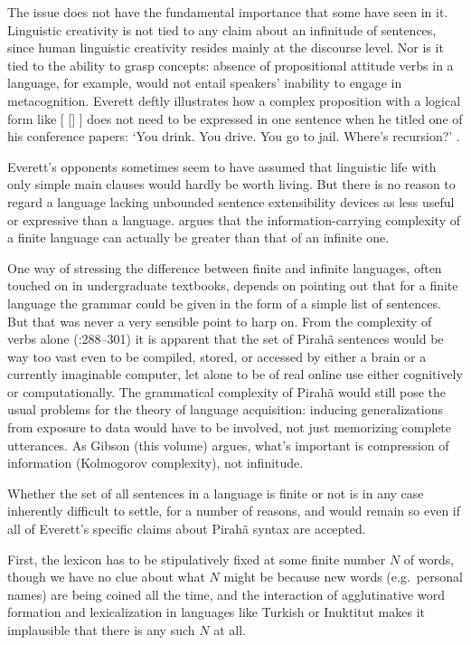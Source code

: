 \documentclass[output=paper,colorlinks,citecolor=brown
]{langscibook}
\begin{document}
The issue does not have the fundamental importance that some have seen
in it. Linguistic creativity is not tied to any claim about an infinitude
of sentences, since human linguistic creativity resides mainly at the
discourse level. Nor is it tied to the ability to grasp concepts:
absence of propositional attitude verbs in a language, for example,
would not entail speakers' inability to engage in metacognition.
Everett deftly illustrates how a complex proposition with a logical
form like [ [] ]  does not need
to be expressed in one sentence when he titled one of his conference
papers: `You drink. You drive. You go to jail. Where's recursion?'
\citep{Everett10}.

Everett's opponents sometimes seem to have assumed that linguistic
life with only simple main clauses would hardly be worth living.
But there is no reason to regard a language lacking unbounded sentence
extensibility devices as less useful or expressive than a language.
\citet{Kornai14} argues that the information-carrying complexity of
a finite language can actually be greater than that of an infinite one.

One way of stressing the difference between finite and infinite languages,
often touched on in undergraduate textbooks, depends on pointing out that
for a finite language the grammar could be given in the form of a simple
list of sentences. But that was never a very sensible point to harp on.
From the complexity of verbs alone (\citealt{Everett86HAL}:288--301)
it is apparent that the set of Pirah{\~a} sentences would be way too vast
even to be compiled, stored, or accessed by either a brain or a currently
imaginable computer, let alone to be of real online use either cognitively
or computationally. The grammatical complexity of Pirah{\~a} would still
pose the usual problems for the theory of language acquisition: inducing
generalizations from exposure to data would have to be involved, not just
memorizing complete utterances. As Gibson (this volume) argues, what's
important is compression of information (Kolmogorov complexity), not
infinitude.

Whether the set of all sentences in a language is finite or not is
in any case inherently difficult to settle, for a number of reasons,
and would remain so even if all of Everett's specific claims about
Pirah{\~a} syntax are accepted.

First, the lexicon has to be stipulatively fixed at some finite number
$N$ of words, though we have no clue about what $N$ might be because
new words (e.g.\ personal names) are being coined all the time, and
the interaction of agglutinative word formation and lexicalization
in languages like Turkish or Inuktitut makes it implausible that there
is any such $N$ at all.
\end{document}
